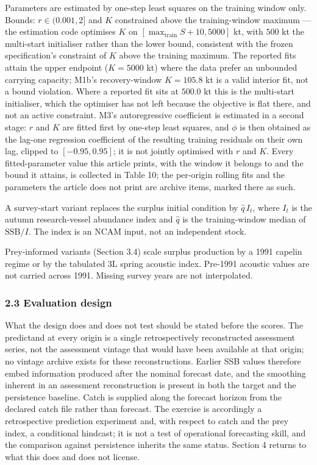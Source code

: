 \documentclass[11pt]{article}
\begin{document}
Parameters are estimated by one-step least squares on the training
window only. Bounds: \(r\in(0.001,2]\) and \(K\) constrained above the
training-window maximum --- the estimation code optimises \(K\) on
\([\max_{\mathrm{train}} S + 10, 5000]\) kt, with \(500\) kt the
multi-start initialiser rather than the lower bound, consistent with the
frozen specification's constraint of \(K\) above the training maximum.
The reported fits attain the upper endpoint (\(K = 5000\) kt) where the
data prefer an unbounded carrying capacity; M1b's recovery-window
\(K = 105.8\) kt is a valid interior fit, not a bound violation. Where a
reported fit sits at \(500.0\) kt this is the multi-start initialiser,
which the optimiser has not left because the objective is flat there,
and not an active constraint. M3's autoregressive coefficient is
estimated in a second stage: \(r\) and \(K\) are fitted first by
one-step least squares, and \(\phi\) is then obtained as the
lag-one regression coefficient of the resulting training residuals on
their own lag, clipped to \([-0.95, 0.95]\); it is not jointly
optimised with \(r\) and \(K\). Every
fitted-parameter value this article prints, with the window it belongs
to and the bound it attains, is collected in Table 10; the per-origin
rolling fits and the parameters the article does not print are archive
items, marked there as such.

A survey-start variant replaces the surplus initial condition by
\(\hat q\,I_t\), where \(I_t\) is the autumn research-vessel abundance
index and \(\hat q\) is the training-window median of
\(\mathrm{SSB}/I\). The index is an NCAM input, not an independent
stock.

Prey-informed variants (Section 3.4) scale surplus production by a 1991
capelin regime or by the tabulated 3L spring acoustic index. Pre-1991
acoustic values are not carried across 1991. Missing survey years are
not interpolated.

\subsubsection{2.3 Evaluation design}\label{evaluation-design}

What the design does and does not test should be stated before the
scores. The predictand at every origin is a single retrospectively
reconstructed assessment series, not the assessment vintage that would
have been available at that origin; no vintage archive exists for these
reconstructions. Earlier SSB values therefore embed information produced
after the nominal forecast date, and the smoothing inherent in an
assessment reconstruction is present in both the target and the
persistence baseline. Catch is supplied along the forecast horizon from
the declared catch file rather than forecast. The exercise is accordingly
a retrospective prediction experiment and, with respect to catch and the
prey index, a conditional hindcast; it is not a test of operational
forecasting skill, and the comparison against persistence inherits the
same status. Section 4 returns to what this does and does not license.
\end{document}
